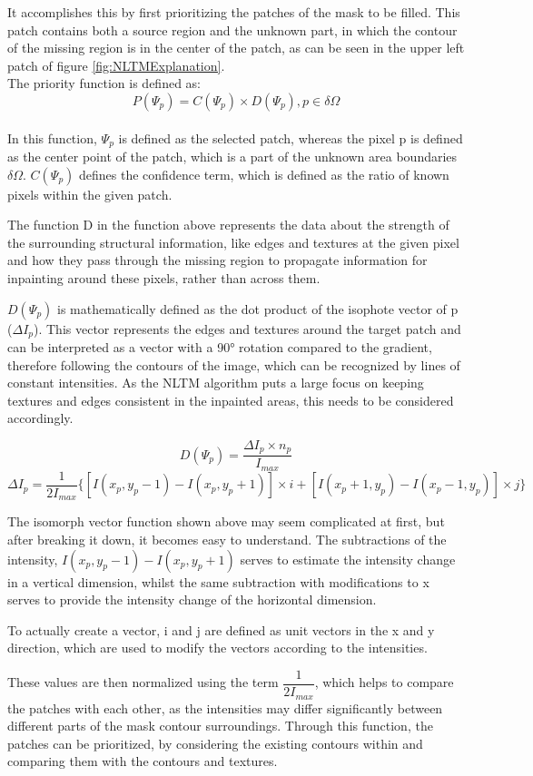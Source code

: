 It accomplishes this by first prioritizing the patches of the mask to be filled. This patch contains both a source region and the unknown part, in which the contour of the missing region is in the center of the patch, as can be seen in the upper left patch of figure \ref{fig:NLTMExplanation}.\\
The priority function is defined as:
\[P(\Psi_p) = C(\Psi_p) \times D(\Psi_p), p \in \delta\Omega\]\\
In this function, $\Psi_p$ is defined as the selected patch, whereas the pixel p is defined as the center point of the patch, which is a part of the unknown area boundaries $\delta\Omega$.
$C(\Psi_p)$ defines the confidence term, which is defined as the ratio of known pixels within the given patch. 

The function D in the function above represents the data about the strength of the surrounding structural information, like edges and textures at the given pixel and how they pass through the missing region to propagate information for inpainting around these pixels, rather than across them. 

$D(\Psi_p)$ is mathematically defined as the dot product of the isophote vector of p ($\Delta I_p$). 
This vector represents the edges and textures around the target patch and can be interpreted as a vector with a 90° rotation compared to the gradient, therefore following the contours of the image, which can be recognized by lines of constant intensities.
As the NLTM algorithm puts a large focus on keeping textures and edges consistent in the inpainted areas, this needs to be considered accordingly.

\[D(\Psi_p) = \dfrac{\Delta I_p \times n_p}{I_{max}}\]
\[\Delta I_p = \dfrac{1}{2I_{max}} \{[I(x_p, y_p - 1) - I(x_p, y_p + 1)] \times i + [I(x_p + 1, y_p) - I(x_p - 1, y_p)] \times j\}\]

The isomorph vector function shown above may seem complicated at first, but after breaking it down, it becomes easy to understand. The subtractions of the intensity, $I(x_p, y_p - 1) - I(x_p, y_p + 1)$ serves to estimate the intensity change in a vertical dimension, whilst the same subtraction with modifications to x serves to provide the intensity change of the horizontal dimension.

To actually create a vector, i and j are defined as unit vectors in the x and y direction, which are used to modify the vectors according to the intensities.

These values are then normalized using the term $\dfrac{1}{2I_{max}}$, which helps to compare the patches with each other, as the intensities may differ significantly between different parts of the mask contour surroundings.
Through this function, the patches can be prioritized, by considering the existing contours within and comparing them with the contours and textures.

